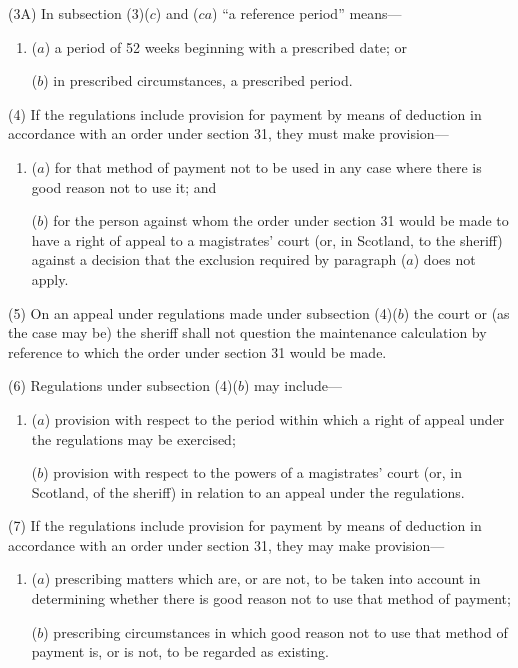 \documentclass[12pt,a4paper]{article}
\begin{document}
(3A) In subsection (3)($c$) and ($ca$) “a reference period” means—
\begin{enumerate}\item[]
($a$) a period of 52 weeks beginning with a prescribed date; or

($b$) in prescribed circumstances, a prescribed period.
\end{enumerate}

(4) If the regulations include provision for payment by means of deduction in accordance with an order under section 31, they must make provision---
\begin{enumerate}\item[]
($a$) for that method of payment not to be used in any case where there is good
reason not to use it; and

($b$) for the person against whom the order under section 31 would be made to
have a right of appeal to a magistrates’ court (or, in Scotland, to the sheriff)
against a decision that the exclusion required by paragraph ($a$) does not
apply.
\end{enumerate}

(5) On an appeal under regulations made under subsection (4)($b$) the court or (as the case may be) the sheriff shall not question the maintenance calculation by reference to which the order under section 31 would be made.

(6) Regulations under subsection (4)($b$) may include---
\begin{enumerate}\item[]
($a$) provision with respect to the period within which a right of appeal under the
regulations may be exercised;

($b$) provision with respect to the powers of a magistrates’ court (or, in Scotland, of 
the sheriff) in relation to an appeal under the regulations.
\end{enumerate}

(7) If the regulations include provision for payment by means of deduction in accordance with an order under section 31, they may make provision---
\begin{enumerate}\item[]
($a$) prescribing matters which are, or are not, to be taken into account in determining whether there is good reason not to use that method of payment;

($b$) prescribing circumstances in which good reason not to use that method of payment is, or is not, to be regarded as existing.
\end{enumerate}
\end{document}
